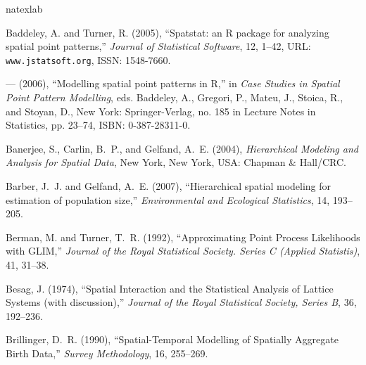 \documentclass[12pt, titlepage]{article}\usepackage[]{graphicx}\usepackage[]{color}
\begin{document}

\clearpage

\begin{thebibliography}{47}
\newcommand{\enquote}[1]{``#1''}
\expandafter\ifx\csname natexlab\endcsname\relax\def\natexlab#1{#1}\fi

Baddeley, A. and Turner, R. (2005), \enquote{Spatstat: an {{\sf R}} package for
  analyzing spatial point patterns,} \textit{Journal of Statistical Software},
  12, 1--42, {URL}: {{\tt www.jstatsoft.org}}, {ISSN}: 1548-7660.

--- (2006), \enquote{Modelling spatial point patterns in {{\sf R}},} in
  \textit{Case Studies in Spatial Point Pattern Modelling}, eds. Baddeley, A.,
  Gregori, P., Mateu, J., Stoica, R., and Stoyan, D., New York:
  Springer-Verlag, no. 185 in Lecture Notes in Statistics, pp. 23--74, {ISBN}:
  0-387-28311-0.

Banerjee, S., Carlin, B.~P., and Gelfand, A.~E. (2004), \textit{Hierarchical
  Modeling and Analysis for Spatial Data}, New York, New York, USA: Chapman \&
  Hall/CRC.

Barber, J.~J. and Gelfand, A.~E. (2007), \enquote{Hierarchical spatial modeling
  for estimation of population size,} \textit{Environmental and Ecological
  Statistics}, 14, 193--205.

Berman, M. and Turner, T.~R. (1992), \enquote{Approximating Point Process
  Likelihoods with GLIM,} \textit{Journal of the Royal Statistical Society.
  Series C (Applied Statistis)}, 41, 31--38.

Besag, J. (1974), \enquote{Spatial Interaction and the Statistical Analysis of
  Lattice Systems (with discussion),} \textit{Journal of the Royal Statistical
  Society, Series B}, 36, 192--236.

Brillinger, D.~R. (1990), \enquote{Spatial-Temporal Modelling of Spatially
  Aggregate Birth Data,} \textit{Survey Methodology}, 16, 255--269.


\end{thebibliography}
\end{document}
